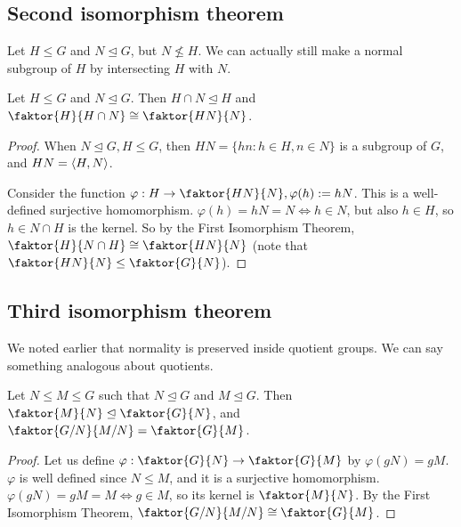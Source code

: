 \subsection{Second isomorphism theorem}
Let \(H\leq G\) and \(N\trianglelefteq G\), but \(N \nleq H\).
We can actually still make a normal subgroup of \(H\) by intersecting \(H\) with \(N\).
\begin{theorem}
	Let \(H \leq G\) and \(N \trianglelefteq G\).
	Then \(H \cap N \trianglelefteq H\) and \(\faktor{H}{H \cap N} \cong \faktor{HN}{N}\).
\end{theorem}
\begin{proof}
	When \(N \trianglelefteq G, H \leq G\), then \(HN = \{ hn: h \in H, n \in N \}\) is a subgroup of \(G\), and \(HN = \left\langle{} H, N \right\rangle\).

	Consider the function \(\varphi: H \to \faktor{HN}{N}, \varphi(h) := hN\).
	This is a well-defined surjective homomorphism.
	\(\varphi(h) = hN = N \iff h \in N\), but also \(h \in H\), so \(h \in N \cap H\) is the kernel.
	So by the First Isomorphism Theorem, \(\faktor{H}{N \cap H} \cong \faktor{HN}{N}\) (note that \(\faktor{HN}{N} \leq \faktor{G}{N}\)).
\end{proof}

\subsection{Third isomorphism theorem}
We noted earlier that normality is preserved inside quotient groups.
We can say something analogous about quotients.
\begin{theorem}
	Let \(N \leq M \leq G\) such that \(N \trianglelefteq G\) and \(M \trianglelefteq G\).
	Then \(\faktor{M}{N} \trianglelefteq \faktor{G}{N}\), and \(\faktor{G/N}{M/N} = \faktor{G}{M}\).
\end{theorem}
\begin{proof}
	Let us define \(\varphi: \faktor{G}{N} \to \faktor{G}{M}\) by \(\varphi(gN) = gM\).
	\(\varphi\) is well defined since \(N \leq M\), and it is a surjective homomorphism.
	\(\varphi(gN) = gM = M \iff g \in M\), so its kernel is \(\faktor{M}{N}\).
	By the First Isomorphism Theorem, \(\faktor{G/N}{M/N} \cong \faktor{G}{M}\).
\end{proof}

